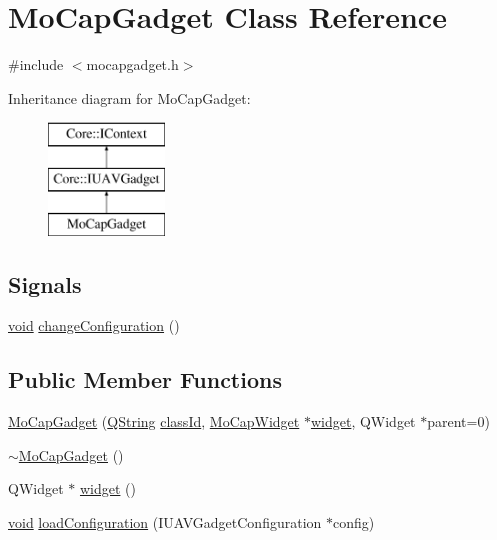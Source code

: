 \hypertarget{class_mo_cap_gadget}{\section{\-Mo\-Cap\-Gadget \-Class \-Reference}
\label{class_mo_cap_gadget}
}


{\ttfamily \#include $<$mocapgadget.\-h$>$}

\-Inheritance diagram for \-Mo\-Cap\-Gadget\-:\begin{figure}[H]
\begin{center}
\leavevmode
\includegraphics[height=3.000000cm]{class_mo_cap_gadget}
\end{center}
\end{figure}
\subsection*{\-Signals}
\begin{DoxyCompactItemize}
\item 
\hyperlink{group___u_a_v_objects_plugin_ga444cf2ff3f0ecbe028adce838d373f5c}{void} \hyperlink{group___mo_cap_plugin_gacbc122d8949ff735984095e5d5bcce1b}{change\-Configuration} ()
\end{DoxyCompactItemize}
\subsection*{\-Public \-Member \-Functions}
\begin{DoxyCompactItemize}
\item 
\hyperlink{group___mo_cap_plugin_ga539f5d9892beeecc36e51d97dacd3263}{\-Mo\-Cap\-Gadget} (\hyperlink{group___u_a_v_objects_plugin_gab9d252f49c333c94a72f97ce3105a32d}{\-Q\-String} \hyperlink{group___core_plugin_ga3878fde66a57220608960bcc3fbeef2c}{class\-Id}, \hyperlink{class_mo_cap_widget}{\-Mo\-Cap\-Widget} $\ast$\hyperlink{group___mo_cap_plugin_ga10e2501808e097eccf87a35bc8111c20}{widget}, \-Q\-Widget $\ast$parent=0)
\item 
\hyperlink{group___mo_cap_plugin_gabcb6599fae9fd93655a6f2c9d72f13e0}{$\sim$\-Mo\-Cap\-Gadget} ()
\item 
\-Q\-Widget $\ast$ \hyperlink{group___mo_cap_plugin_ga10e2501808e097eccf87a35bc8111c20}{widget} ()
\item 
\hyperlink{group___u_a_v_objects_plugin_ga444cf2ff3f0ecbe028adce838d373f5c}{void} \hyperlink{group___mo_cap_plugin_ga3ec1dcb97187294b0436fd7a0e5532d1}{load\-Configuration} (\-I\-U\-A\-V\-Gadget\-Configuration $\ast$config)
\end{DoxyCompactItemize}


